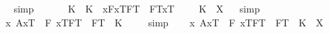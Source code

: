 \begin{isabellebody}
\isadelimproof
\ %
\endisadelimproof
%
\isatagproof
{}\isamarkupfalse%
\ simp\ \ \isamarkupfalse%
\ %
%
\endisatagproof
{\isafoldproof}%
%
\isadelimproof
%
\endisadelimproof
\isanewline
\isanewline
\ \isamarkupfalse%
\ K\ \ {\isachardoublequoteopen}K\ {\isasymequiv}\ \isactrlbold {\isasymlambda}x{\isachardot}\isactrlbold {\isasymexists}F{\isachardot}{\isacharparenleft}{\isasymlbrace}x\isactrlsup T{\isacharcomma}F\isactrlsup T{\isasymrbrace}\ \isactrlbold {\isasymrightarrow}\ {\isasymlparr}F\isactrlsup T{\isacharcomma}x\isactrlsup T{\isasymrparr}{\isacharparenright}{\isachardoublequoteclose}\isanewline
\ \isanewline
\ \isamarkupfalse%
\ {\isachardoublequoteopen}K\ {\isacharequal}\ X{\isachardoublequoteclose}%
\isadelimproof
\ %
\endisadelimproof
%
\isatagproof
{}\isamarkupfalse%
\ simp\ \isamarkupfalse%
\ \ %
%
\endisatagproof
{\isafoldproof}%
%
\isadelimproof
%
\endisadelimproof
\isanewline
\isanewline
\ \isamarkupfalse%
\ {\isachardoublequoteopen}{\isacharbrackleft}{\isacharparenleft}\isactrlbold {\isasymexists}x{\isachardot}\ {\isasymlparr}A{\isacharbang}{\isacharcomma}x\isactrlsup T{\isasymrparr}\ \isactrlbold {\isasymand}\ {\isacharparenleft}\isactrlbold {\isasymforall}F{\isachardot}\ {\isacharparenleft}{\isasymlbrace}x\isactrlsup T{\isacharcomma}F\isactrlsup T{\isasymrbrace}\ \isactrlbold {\isasymequiv}\ F\isactrlsup T\ \isactrlbold {\isacharequal}\ K{\isacharparenright}{\isacharparenright}{\isacharparenright}{\isacharbrackright}\ {\isacharequal}\ {\isacharasterisk}{\isachardoublequoteclose}%
\isadelimproof
\ %
\endisadelimproof
%
\isatagproof
{}\isamarkupfalse%
\ simp\ \isamarkupfalse%
%
\endisatagproof
{\isafoldproof}%
%
\isadelimproof
%
\endisadelimproof
\isanewline
\ \isamarkupfalse%
\ {\isachardoublequoteopen}{\isacharparenleft}\isactrlbold {\isasymexists}x{\isachardot}\ {\isasymlparr}A{\isacharbang}{\isacharcomma}x\isactrlsup T{\isasymrparr}\ \isactrlbold {\isasymand}\ {\isacharparenleft}\isactrlbold {\isasymforall}F{\isachardot}\ {\isacharparenleft}{\isasymlbrace}x\isactrlsup T{\isacharcomma}F\isactrlsup T{\isasymrbrace}\ \isactrlbold {\isasymequiv}\ F\isactrlsup T\ \isactrlbold {\isacharequal}\ K{\isacharparenright}{\isacharparenright}{\isacharparenright}\ {\isacharequal}\ X{\isachardoublequoteclose}%

\end{isabellebody}
